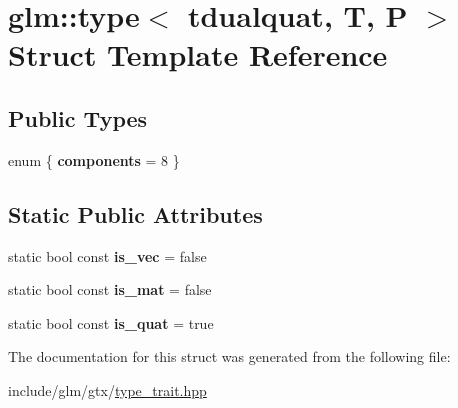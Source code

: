 \hypertarget{structglm_1_1type_3_01tdualquat_00_01T_00_01P_01_4}{}\section{glm\+:\+:type$<$ tdualquat, T, P $>$ Struct Template Reference}
\label{structglm_1_1type_3_01tdualquat_00_01T_00_01P_01_4}
\subsection*{Public Types}
\begin{DoxyCompactItemize}
\item 
\mbox{\label{structglm_1_1type_3_01tdualquat_00_01T_00_01P_01_4_ab20d2d488860c2843db0381af324216f}} 
enum \{ {\bfseries components} = 8
 \}
\end{DoxyCompactItemize}
\subsection*{Static Public Attributes}
\begin{DoxyCompactItemize}
\item 
\mbox{\label{structglm_1_1type_3_01tdualquat_00_01T_00_01P_01_4_a89d63524f1e7f9f54a545c9ddd1cc8b4}} 
static bool const {\bfseries is\+\_\+vec} = false
\item 
\mbox{\label{structglm_1_1type_3_01tdualquat_00_01T_00_01P_01_4_a4ff76551c61e4695135ea1e346d3a49e}} 
static bool const {\bfseries is\+\_\+mat} = false
\item 
\mbox{\label{structglm_1_1type_3_01tdualquat_00_01T_00_01P_01_4_a4a599be3c9026cb94b95daf760a5edc1}} 
static bool const {\bfseries is\+\_\+quat} = true
\end{DoxyCompactItemize}


The documentation for this struct was generated from the following file\+:\begin{DoxyCompactItemize}
\item 
include/glm/gtx/\hyperlink{type__trait_8hpp}{type\+\_\+trait.\+hpp}\end{DoxyCompactItemize}
